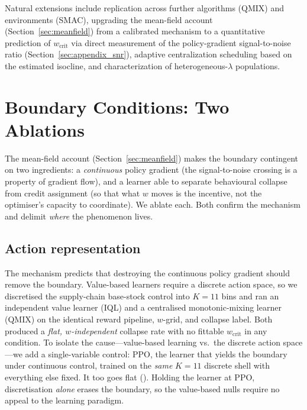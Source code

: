 \documentclass[letterpaper]{article}
\theoremstyle{plain}
\newcommand{\wcrit}{w_{\mathrm{crit}}}
\begin{document}
Natural extensions include replication across further algorithms (QMIX) and
environments (SMAC), upgrading the mean-field account
(Section~\ref{sec:meanfield}) from a calibrated mechanism to a quantitative
prediction of $\wcrit$ via direct measurement of the policy-gradient
signal-to-noise ratio (Section~\ref{sec:appendix_snr}), adaptive centralization
scheduling based on the estimated isocline, and characterization of
heterogeneous-$\lambda$ populations.



\appendix

\section{Boundary Conditions: Two Ablations}
\label{sec:appendix_ablations}

The mean-field account (Section~\ref{sec:meanfield}) makes the boundary contingent on
two ingredients: a \emph{continuous} policy gradient (the signal-to-noise
crossing is a property of gradient flow), and a learner able to separate
behavioural collapse from credit assignment (so that what $w$ moves is the
incentive, not the optimiser's capacity to coordinate). We ablate each. Both
confirm the mechanism and delimit \emph{where} the phenomenon lives.

\subsection{Action representation}
\label{sec:ablation_action}
The mechanism predicts that destroying the continuous policy gradient should
remove the boundary. Value-based learners require a discrete action space, so we
discretised the supply-chain base-stock control into $K{=}11$ bins and ran an
independent value learner (IQL) and a centralised monotonic-mixing learner
(QMIX) on the identical reward pipeline, $w$-grid, and collapse label. Both
produced a \emph{flat, $w$-independent} collapse rate with no fittable $\wcrit$
in any condition. To isolate the cause---value-based learning vs.\ the discrete
action space---we add a single-variable control: PPO, the learner that yields
the boundary under continuous control, trained on the \emph{same} $K{=}11$
discrete shell with everything else fixed. It too goes flat
(). Holding the learner at PPO, discretisation
\emph{alone} erases the boundary, so the value-based nulls require no appeal to
the learning paradigm.
\end{document}
